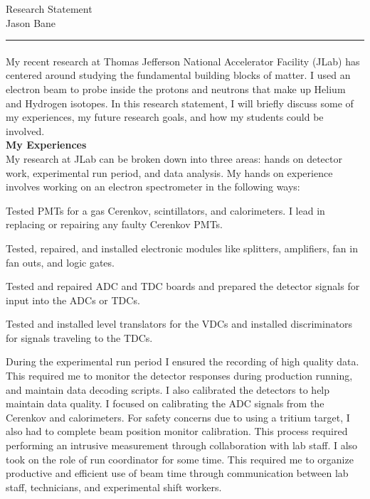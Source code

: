 \documentclass[12pt,letterpaper]{article}
\begin{document}
\begin{center}	
	{\huge  Research Statement}\\
	{\large Jason Bane}
\end{center}
\hrule
\paragraph{}My recent research at Thomas Jefferson National Accelerator Facility (JLab) has centered around studying the fundamental building blocks of matter. I used an electron beam to probe inside the protons and neutrons that make up Helium and Hydrogen isotopes. In this research statement, I will briefly discuss some of my experiences, my future research goals, and how my students could be involved. \\

\noindent\textbf{My Experiences}\\
\indent My research at JLab can be broken down into three areas: hands on detector work, experimental run period, and data analysis. My hands on experience involves working on an electron spectrometer in the following ways:
\begin{itemize*}
\item Tested PMTs for a gas Cerenkov, scintillators, and calorimeters. I lead in replacing or repairing any faulty Cerenkov PMTs.
\item Tested, repaired, and installed electronic modules like splitters, amplifiers, fan in fan outs, and logic gates. 
\item Tested and repaired ADC and TDC boards and prepared the detector signals for input into the ADCs or TDCs. 
\item  Tested and installed level translators for the VDCs and installed discriminators for signals traveling to the TDCs.
\end{itemize*}

\indent During the experimental run period I ensured the recording of high quality data. This required me to monitor the detector responses during production running, and maintain data decoding scripts. I also calibrated the detectors to help maintain data quality. I focused on calibrating the ADC signals from the Cerenkov and calorimeters. For safety concerns due to using a tritium target, I also had to complete beam position monitor calibration. This process required performing an intrusive measurement through collaboration with lab staff. I also took on the role of run coordinator for some time. This required me to organize productive and efficient use of beam time through communication between lab staff, technicians, and experimental shift workers.\\
\end{document}
